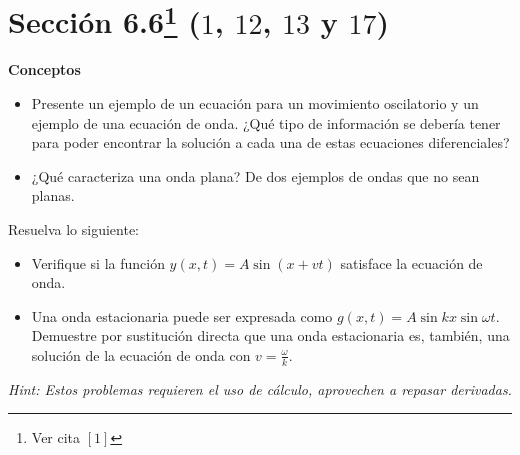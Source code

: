 \section*{Sección 6.6\footnote{Ver cita $[1]$} ($1$, $12$, $13$ y $17$)}


\begin{mdframed}[style=warning]
	{\large \textbf{Conceptos}}
	\begin{itemize}
		\item Presente un ejemplo de un ecuación para un movimiento oscilatorio y un ejemplo de una ecuación de onda. ¿Qué tipo de información se debería tener para poder encontrar la solución a cada una de estas ecuaciones diferenciales?
		\item ¿Qué caracteriza una onda plana? De dos ejemplos de ondas que no sean planas.
	\end{itemize}
\end{mdframed}



















\begin{mdframed}[style=warning]
	\begin{ejercicio}
		Resuelva lo siguiente:
		\begin{itemize}
			\item Verifique si la función $y(x,t) = A\sin{(x + vt)}$ satisface la ecuación de onda.
			\item Una onda estacionaria puede ser expresada como $g(x,t) = A\sin{kx} \sin{\omega t}$. Demuestre por sustitución directa que una onda estacionaria es, también, una solución de la ecuación de onda con $v = \frac{\omega}{k}$.
		\end{itemize}
	\end{ejercicio}
	\noindent \textit{Hint: Estos problemas requieren el uso de cálculo, aprovechen a repasar derivadas.}
\end{mdframed}






